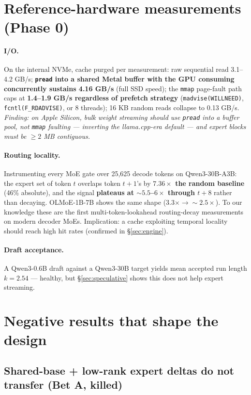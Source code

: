 \documentclass[11pt]{article}
\begin{document}
\section{Reference-hardware measurements (Phase 0)}

\paragraph{I/O.} On the internal NVMe, cache purged per measurement: raw sequential read 3.1--4.2 GB/s; \textbf{\texttt{pread} into a shared Metal buffer with the GPU consuming concurrently sustains 4.16 GB/s} (full SSD speed); the \texttt{mmap} page-fault path caps at \textbf{1.4--1.9 GB/s regardless of prefetch strategy} (\texttt{madvise(WILLNEED)}, \texttt{fcntl(F\_RDADVISE)}, or 8 threads); 16 KB random reads collapse to 0.13 GB/s. \emph{Finding: on Apple Silicon, bulk weight streaming should use \texttt{pread} into a buffer pool, not \texttt{mmap} faulting --- inverting the llama.cpp-era default --- and expert blocks must be ${\ge}2$ MB contiguous.}

\paragraph{Routing locality.} Instrumenting every MoE gate over 25{,}625 decode tokens on Qwen3-30B-A3B: the expert set of token $t$ overlaps token $t{+}1$'s by \textbf{$7.36\times$ the random baseline} (46\% absolute), and the signal \textbf{plateaus at ${\sim}5.5$--$6\times$ through $t{+}8$} rather than decaying. OLMoE-1B-7B shows the same shape ($3.3\times \to {\sim}2.5\times$). To our knowledge these are the first multi-token-lookahead routing-decay measurements on modern decoder MoEs. Implication: a cache exploiting temporal locality should reach high hit rates (confirmed in \S\ref{sec:engine}).

\paragraph{Draft acceptance.} A Qwen3-0.6B draft against a Qwen3-30B target yields mean accepted run length $k=2.54$ --- healthy, but \S\ref{sec:speculative} shows this does not help expert streaming.

\section{Negative results that shape the design}

\subsection{Shared-base + low-rank expert deltas do not transfer (Bet A, killed)}
\end{document}
